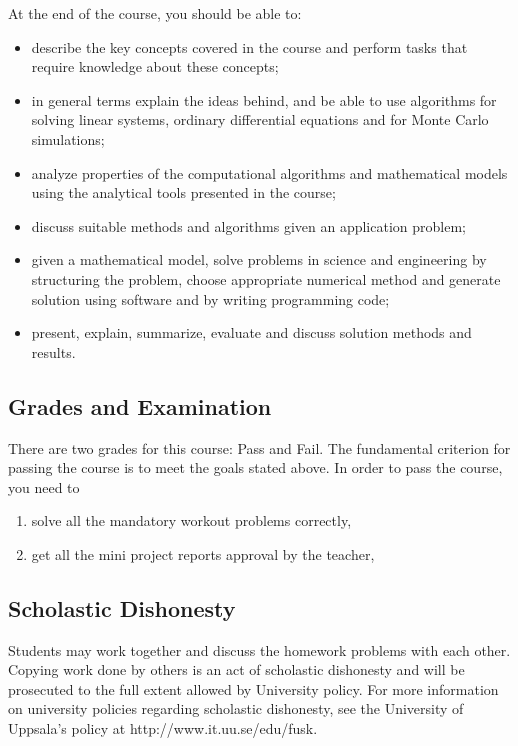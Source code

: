 \documentclass[a4paper,12pt]{article}
\begin{document}
At the end of the course, you should be able to:

\begin{itemize}
	\item describe the key concepts covered in the course and perform tasks that require knowledge about these concepts;
	\item in general terms explain the ideas behind, and be able to use algorithms
	for solving linear systems, ordinary differential equations and for
	Monte Carlo simulations;
	\item analyze properties of the computational algorithms and mathematical models using the analytical tools presented in the course;
	\item discuss suitable methods and algorithms given an application problem;
	\item given a mathematical model, solve problems in science and engineering	by structuring the problem, choose appropriate numerical method and	generate solution using software and by writing programming code;
	\item present, explain, summarize, evaluate and discuss solution methods and results.
\end{itemize}

\setlength{\leftskip}{0em}
\subsection*{Grades and Examination}
\setlength{\leftskip}{1em}


There are two grades for this course: Pass and Fail. The fundamental criterion
for passing the course is to meet the goals stated above. In order to pass the
course, you need to

\begin{enumerate}
	\item solve all the mandatory workout problems correctly,
	\item get all the mini project reports approval by the teacher,
\end{enumerate}


\setlength{\leftskip}{0em}
\subsection*{Scholastic Dishonesty}
\setlength{\leftskip}{1em} 
Students may work together and discuss the
homework problems with each other. Copying work done by others is an
act of scholastic dishonesty and will be prosecuted to the full extent
allowed by University policy. For more information on university
policies regarding scholastic dishonesty, see the University of
Uppsala's policy at http://www.it.uu.se/edu/fusk. 
\end{document}
